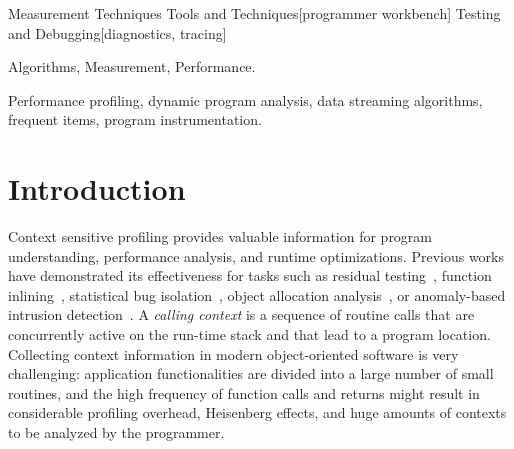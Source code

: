 \documentclass{sigplanconf}
\begin{document}
 {Measurement Techniques}
 {Tools and Techniques}[programmer workbench]
 {Testing and Debugging}[diagnostics, tracing]

\terms Algorithms, Measurement, Performance.

\keywords Performance profiling, dynamic program analysis, data streaming algorithms, frequent items, program instrumentation.


\section{Introduction}
\label{se:intro}

Context sensitive profiling provides valuable information for program understanding, performance analysis, and runtime optimizations. Previous works have demonstrated its effectiveness for tasks such as residual testing~\cite{PavlopoulouY99, VNC07}, function inlining~\cite{CMCH92}, statistical bug isolation~\cite{Feng03, Liblit03}, object allocation analysis~\cite{NethercoteS07}, or anomaly-based intrusion detection~\cite{BM07}. A {\em calling context} is a sequence of routine calls that are concurrently active on the run-time stack and that lead to a program location. Collecting context information in modern object-oriented software is very challenging: application functionalities are divided into a large number of small routines, and the high frequency of function calls and returns might result in considerable profiling overhead, Heisenberg effects, and huge amounts of contexts to be analyzed by the programmer.
\end{document}
